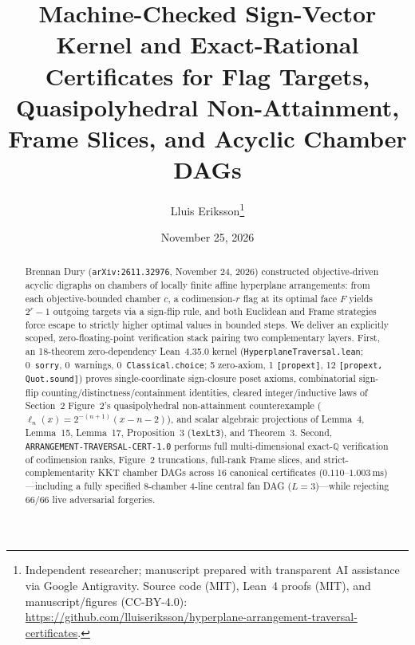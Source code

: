 \documentclass[10pt,twocolumn]{article}
\title{\vspace{-0.8em}\textbf{Machine-Checked Sign-Vector Kernel and Exact-Rational Certificates for Flag Targets, Quasipolyhedral Non-Attainment, Frame Slices, and Acyclic Chamber DAGs}}
\author{Lluis Eriksson\thanks{Independent researcher; manuscript prepared with transparent AI assistance via Google Antigravity. Source code (MIT), Lean~4 proofs (MIT), and manuscript/figures (CC-BY-4.0): \url{https://github.com/lluiseriksson/hyperplane-arrangement-traversal-certificates}.}}
\date{November 25, 2026}
\newcommand{\QQ}{\mathbb{Q}}
\begin{document}
\maketitle
\vspace{-1.1em}

\begin{abstract}
Brennan Dury (\texttt{arXiv:2611.32976}, November 24, 2026) constructed objective-driven acyclic digraphs on chambers of locally finite affine hyperplane arrangements: from each objective-bounded chamber $c$, a codimension-$r$ flag at its optimal face $F$ yields $2^r - 1$ outgoing targets via a sign-flip rule, and both Euclidean and Frame strategies force escape to strictly higher optimal values in bounded steps. We deliver an explicitly scoped, zero-floating-point verification stack pairing two complementary layers. First, an 18-theorem zero-dependency Lean~4.35.0 kernel (\texttt{HyperplaneTraversal.lean}; 0~\texttt{sorry}, 0~warnings, 0~\texttt{Classical.choice}; 5 zero-axiom, 1 \texttt{[propext]}, 12 \texttt{[propext, Quot.sound]}) proves single-coordinate sign-closure poset axioms, combinatorial sign-flip counting/distinctness/containment identities, cleared integer/inductive laws of Section~2 Figure~2's quasipolyhedral non-attainment counterexample ($\ell_n(x)=2^{-(n+1)}(x-n-2)$), and scalar algebraic projections of Lemma~4, Lemma~15, Lemma~17, Proposition~3 (\texttt{lexLt3}), and Theorem~3. Second, \texttt{ARRANGEMENT-TRAVERSAL-CERT-1.0} performs full multi-dimensional exact-$\QQ$ verification of codimension ranks, Figure~2 truncations, full-rank Frame slices, and strict-complementarity KKT chamber DAGs across 16 canonical certificates ($0.110$--$1.003\,\mathrm{ms}$)—including a fully specified 8-chamber 4-line central fan DAG ($L=3$)—while rejecting 66/66 live adversarial forgeries.
\end{abstract}
\end{document}

